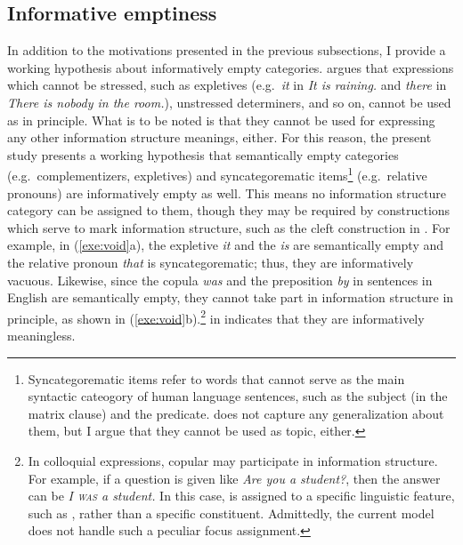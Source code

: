 \subsection{Informative emptiness}  
\label{9:sec:hypotheses}


In addition to the motivations presented in the previous subsections,
I provide a working hypothesis about informatively empty categories.
\citet[156]{lambrecht:96} argues that expressions which cannot be
stressed, such as expletives (e.g.\ \textit{it} in \textit{It is
  raining.} and \textit{there} in \textit{There is nobody in the
  room.}), unstressed determiners, and so on, cannot be used as 
in principle.  What is to be noted is that they cannot be used for
expressing any other information structure meanings, either.  For this
reason, the present study presents a working hypothesis that
semantically empty categories (e.g.\ complementizers, expletives) and
syncategorematic items\footnote{Syncategorematic items refer to words
  that cannot serve as the main syntactic cateogory of human language
  sentences, such as the subject (in the matrix clause) and the
  predicate.  \citet{lambrecht:96} does not capture any generalization
  about them, but I argue that they cannot be used as topic, either.}
(e.g.\ relative pronouns) are informatively empty as well. This means
no information structure category can be assigned to them, though they
may be required by constructions which serve to mark information
structure, such as the cleft construction in
. For example, in
(\ref{exe:void}a), the expletive \textit{it} and the  
\textit{is} are semantically empty and the relative pronoun \textit{that} is
syncategorematic; thus, they are informatively vacuous. Likewise,
since the copula \textit{was} and the preposition \textit{by} in
 sentences in English are semantically empty, they cannot
take part in information structure in principle, as shown in
(\ref{exe:void}b).\footnote{In colloquial expressions, copular may
  participate in information structure.  For example, if a question is
  given like \textit{Are you a student?}, then the answer can be
  \textit{I \textsc{was} a student.}  In this case,  is assigned
  to a specific linguistic feature, such as , rather than a
  specific constituent.  Admittedly, the current model does not handle
  such a peculiar focus assignment.}   in
 indicates that they are informatively meaningless.





